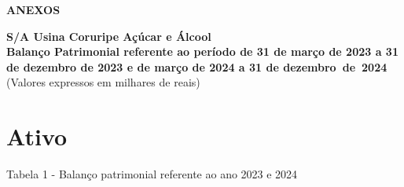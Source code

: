 \documentclass[1pt,a4paper]{article}
\begin{document}
	
		
	
	\newpage
	
	\centering \textbf{ANEXOS}
		
		\begin{center}
			\textbf{\Large S/A Usina Coruripe Açúcar e Álcool}\\
			\textbf{Balanço Patrimonial referente ao período de 31 de março de 2023 a 31 de dezembro de 2023 e de março de 2024 a 31 de dezembro de 2024}\\
			(Valores expressos em milhares de reais)
		\end{center}
		
		
		
		\centering\section*{Ativo}
		Tabela 1 - Balanço patrimonial referente ao ano 2023 e 2024
\end{document}
